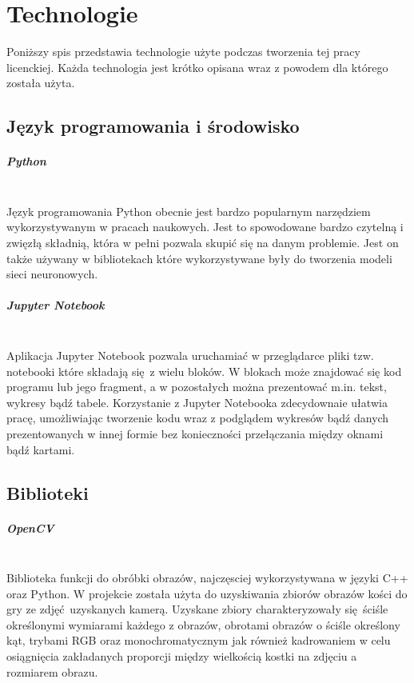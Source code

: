 
\chapter{Technologie}

Poniższy spis przedstawia technologie użyte podczas tworzenia tej pracy licenckiej.
Każda technologia jest krótko opisana wraz z powodem dla którego została użyta.

\section{Język programowania i środowisko}

\paragraph{Python} \mbox{}\\
Język programowania Python obecnie jest bardzo popularnym narzędziem wykorzystywanym
w pracach naukowych. Jest to spowodowane bardzo czytelną i zwięzłą składnią,
która w pełni pozwala skupić się na danym problemie. Jest on także używany w
bibliotekach które wykorzystywane były do tworzenia modeli sieci neuronowych.

\paragraph{Jupyter Notebook} \mbox{}\\
Aplikacja Jupyter Notebook pozwala uruchamiać w przeglądarce pliki tzw. notebooki
które składają się z wielu bloków. W blokach może znajdować się kod programu lub
jego fragment, a w pozostałych można prezentować m.in. tekst, wykresy bądź tabele.
Korzystanie z Jupyter Notebooka zdecydownaie ułatwia pracę, umożliwiając tworzenie
kodu wraz z podglądem wykresów bądź danych prezentowanych w innej formie bez
konieczności przełączania między oknami bądź kartami.

\section{Biblioteki}

\paragraph{OpenCV} \mbox{}\\
Biblioteka funkcji do obróbki obrazów, najczęsciej wykorzystywana w języki C++
oraz Python. W projekcie została użyta do uzyskiwania zbiorów obrazów kości do gry
ze zdjęć uzyskanych kamerą. Uzyskane zbiory charakteryzowały się ściśle określonymi
wymiarami każdego z obrazów, obrotami obrazów o ściśle określony kąt, trybami RGB
oraz monochromatycznym jak również kadrowaniem w celu osiągnięcia zakładanych
proporcji między wielkością kostki na zdjęciu a rozmiarem obrazu.

